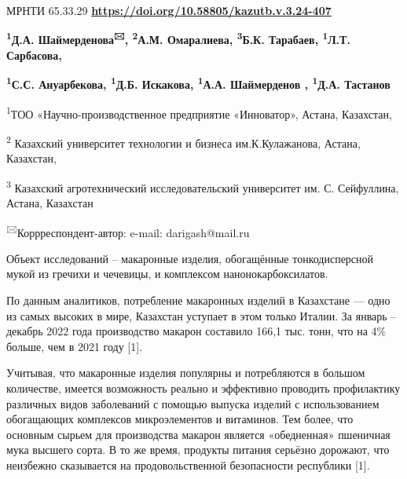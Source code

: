 \newpage
МРНТИ 65.33.29
\hfill {\bfseries \href{https://doi.org/10.58805/kazutb.v.3.24-407}{https://doi.org/10.58805/kazutb.v.3.24-407}}

\begin{center}

{\bfseries \textsuperscript{1}Д.А. Шаймерденова\textsuperscript{🖂},
\textsuperscript{2}А.М. Омаралиева, \textsuperscript{3}Б.К. Тарабаев,
\textsuperscript{1}Л.Т. Сарбасова,}

{\bfseries \textsuperscript{1}С.С. Ануарбекова, \textsuperscript{1}Д.Б.
Искакова, \textsuperscript{1}А.А. Шаймерденов , \textsuperscript{1}Д.А.
Тастанов}

\textsuperscript{1}ТОО «Научно-производственное предприятие «Инноватор»,
Астана, Казахстан,

\textsuperscript{2} Казахский университет технологии и бизнеса
им.К.Кулажанова, Астана, Казахстан,

\textsuperscript{3} Казахский агротехнический исследовательский
университет им. С. Сейфуллина, Астана, Казахстан
\end{center}
\textsuperscript{🖂}Коррреспондент-автор: e-mail: darigash@mail.ru\vspace{0.5cm}

Объект исследований -- макаронные изделия, обогащённые тонкодисперсной
мукой из гречихи и чечевицы, и комплексом нанонокарбоксилатов.

По данным аналитиков, потребление макаронных изделий в Казахстане ---
одно из самых высоких в мире, Казахстан уступает в этом только Италии.
За январь -- декабрь 2022 года производство макарон составило 166,1 тыс.
тонн, что на 4\% больше, чем в 2021 году {[}1{]}.

Учитывая, что макаронные изделия популярны и потребляются в большом
количестве, имеется возможность реально и эффективно проводить
профилактику различных видов заболеваний с помощью выпуска изделий с
использованием обогащающих комплексов микроэлементов и витаминов. Тем
более, что основным сырьем для производства макарон является
«обедненная» пшеничная мука высшего сорта. В то же время, продукты
питания серьёзно дорожают, что неизбежно сказывается на
продовольственной безопасности республики {[}1{]}.

